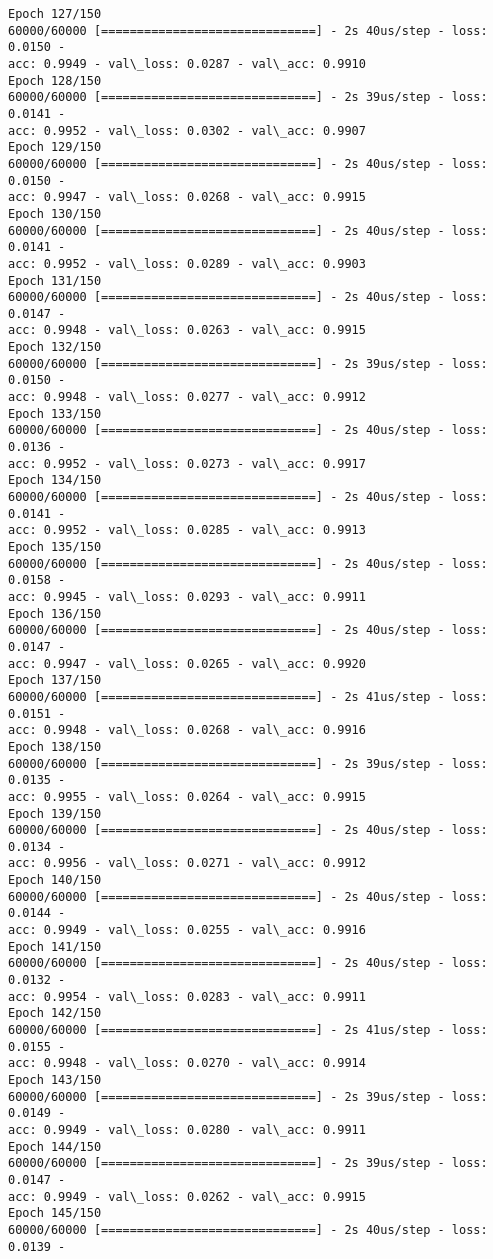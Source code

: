 \documentclass[11pt]{article}
\begin{document}
\begin{Verbatim}[commandchars=\\\{\}]
Epoch 127/150
60000/60000 [==============================] - 2s 40us/step - loss: 0.0150 -
acc: 0.9949 - val\_loss: 0.0287 - val\_acc: 0.9910
Epoch 128/150
60000/60000 [==============================] - 2s 39us/step - loss: 0.0141 -
acc: 0.9952 - val\_loss: 0.0302 - val\_acc: 0.9907
Epoch 129/150
60000/60000 [==============================] - 2s 40us/step - loss: 0.0150 -
acc: 0.9947 - val\_loss: 0.0268 - val\_acc: 0.9915
Epoch 130/150
60000/60000 [==============================] - 2s 40us/step - loss: 0.0141 -
acc: 0.9952 - val\_loss: 0.0289 - val\_acc: 0.9903
Epoch 131/150
60000/60000 [==============================] - 2s 40us/step - loss: 0.0147 -
acc: 0.9948 - val\_loss: 0.0263 - val\_acc: 0.9915
Epoch 132/150
60000/60000 [==============================] - 2s 39us/step - loss: 0.0150 -
acc: 0.9948 - val\_loss: 0.0277 - val\_acc: 0.9912
Epoch 133/150
60000/60000 [==============================] - 2s 40us/step - loss: 0.0136 -
acc: 0.9952 - val\_loss: 0.0273 - val\_acc: 0.9917
Epoch 134/150
60000/60000 [==============================] - 2s 40us/step - loss: 0.0141 -
acc: 0.9952 - val\_loss: 0.0285 - val\_acc: 0.9913
Epoch 135/150
60000/60000 [==============================] - 2s 40us/step - loss: 0.0158 -
acc: 0.9945 - val\_loss: 0.0293 - val\_acc: 0.9911
Epoch 136/150
60000/60000 [==============================] - 2s 40us/step - loss: 0.0147 -
acc: 0.9947 - val\_loss: 0.0265 - val\_acc: 0.9920
Epoch 137/150
60000/60000 [==============================] - 2s 41us/step - loss: 0.0151 -
acc: 0.9948 - val\_loss: 0.0268 - val\_acc: 0.9916
Epoch 138/150
60000/60000 [==============================] - 2s 39us/step - loss: 0.0135 -
acc: 0.9955 - val\_loss: 0.0264 - val\_acc: 0.9915
Epoch 139/150
60000/60000 [==============================] - 2s 40us/step - loss: 0.0134 -
acc: 0.9956 - val\_loss: 0.0271 - val\_acc: 0.9912
Epoch 140/150
60000/60000 [==============================] - 2s 40us/step - loss: 0.0144 -
acc: 0.9949 - val\_loss: 0.0255 - val\_acc: 0.9916
Epoch 141/150
60000/60000 [==============================] - 2s 40us/step - loss: 0.0132 -
acc: 0.9954 - val\_loss: 0.0283 - val\_acc: 0.9911
Epoch 142/150
60000/60000 [==============================] - 2s 41us/step - loss: 0.0155 -
acc: 0.9948 - val\_loss: 0.0270 - val\_acc: 0.9914
Epoch 143/150
60000/60000 [==============================] - 2s 39us/step - loss: 0.0149 -
acc: 0.9949 - val\_loss: 0.0280 - val\_acc: 0.9911
Epoch 144/150
60000/60000 [==============================] - 2s 39us/step - loss: 0.0147 -
acc: 0.9949 - val\_loss: 0.0262 - val\_acc: 0.9915
Epoch 145/150
60000/60000 [==============================] - 2s 40us/step - loss: 0.0139 -

\end{Verbatim}
\end{document}
